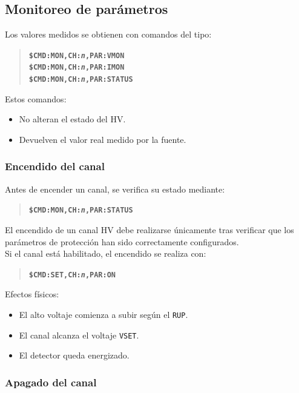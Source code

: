 \documentclass{article}
\begin{document}
\subsection{Monitoreo de parámetros}

Los valores medidos se obtienen con comandos del tipo:

\begin{quote}
\textbf{\texttt{\$CMD:MON,CH:\emph{n},PAR:VMON}} \\
\textbf{\texttt{\$CMD:MON,CH:\emph{n},PAR:IMON}} \\
\textbf{\texttt{\$CMD:MON,CH:\emph{n},PAR:STATUS}}
\end{quote}

Estos comandos:
\begin{itemize}
    \item No alteran el estado del HV.
    \item Devuelven el valor real medido por la fuente.
\end{itemize}

\subsubsection{Encendido del canal}

Antes de encender un canal, se verifica su estado mediante:

\begin{quote}
\textbf{\texttt{\$CMD:MON,CH:\emph{n},PAR:STATUS}}
\end{quote}

El encendido de un canal HV debe realizarse únicamente tras verificar que los parámetros de protección han sido correctamente configurados.\\

Si el canal está habilitado, el encendido se realiza con:

\begin{quote}
\textbf{\texttt{\$CMD:SET,CH:\emph{n},PAR:ON}}
\end{quote}

Efectos físicos:
\begin{itemize}
    \item El alto voltaje comienza a subir según el \texttt{RUP}.
    \item El canal alcanza el voltaje \texttt{VSET}.
    \item El detector queda energizado.
\end{itemize}

\subsubsection{Apagado del canal}
\end{document}
